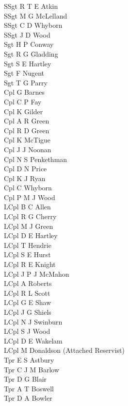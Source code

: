 \begin{multicols}{4}
  \scriptsize
  \noindent
  SSgt R T E Atkin \\
  SSgt M G McLelland \\
  SSgt C D Whyborn \\
  SSgt J D Wood \\
  Sgt H P Conway \\
  Sgt R G Gladding \\
  Sgt S E Hartley \\
  Sgt F Nugent \\
  Sgt T G Parry \\
  Cpl G Barnes \\
  Cpl C P Fay \\
  Cpl K Gilder \\
  Cpl A R Green \\
  Cpl R D Green \\
  Cpl K McTigue \\
  Cpl J J Noonan \\
  Cpl N S Penkethman \\
  Cpl D N Price \\
  Cpl K J Ryan \\
  Cpl C Whyborn \\
  Cpl P M J Wood \\
  LCpl B C Allen \\
  LCpl R G Cherry \\
  LCpl M J Green \\
  LCpl D E Hartley \\
  LCpl T Hendrie \\
  LCpl S E Hurst \\
  LCpl R E Knight \\
  LCpl J P J McMahon \\
  LCpl A Roberts \\
  LCpl R L Scott \\
  LCpl G E Shaw \\
  LCpl J G Shiels \\
  LCpl N J Swinburn \\
  LCpl S J Wood \\
  LCpl D E Wakelam \\
  LCpl M Donaldson (Attached Reservist) \\
  Tpr E S Astbury \\
  Tpr C J M Barlow \\
  Tpr D G Blair \\
  Tpr A T Boswell \\
  Tpr D A Bowler \\

\end{multicols}
